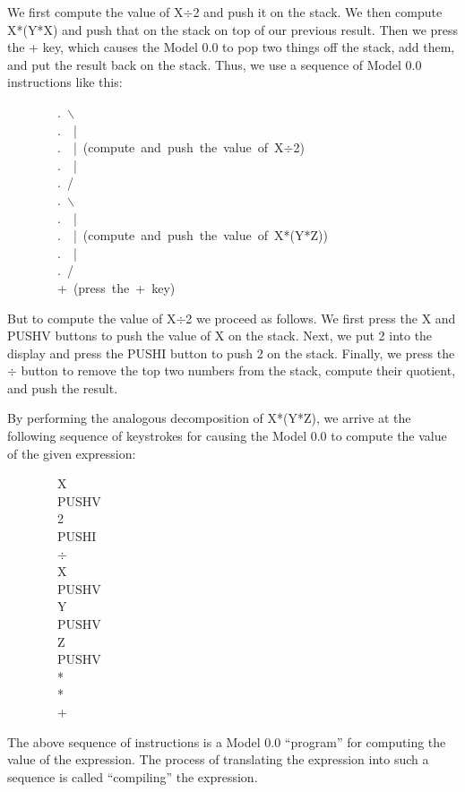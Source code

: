 \documentclass[11pt]{book}
\newenvironment{pubasis}{\begin{flushleft}\ttfamily\small}{\normalsize\rmfamily\end{flushleft}}
\begin{document}
We  first compute
the value of X$\div$2 and push it on the stack.  We  then compute
X*(Y*X) and push that on the stack on top of
our previous result.  Then we
press the + key, which causes the Model 0.0 to pop
two things off the stack, add them, and put the result back on the
stack.  Thus, we  use a sequence of Model 0.0 instructions
like this:
\begin{pubasis}
~~~~~~~~.~$\backslash$\\
~~~~~~~~.~~|\\
~~~~~~~~.~~|~(compute~and~push~the~value~of~X$\div$2)\\
~~~~~~~~.~~|\\
~~~~~~~~.~/\\

~~~~~~~~.~$\backslash$\\
~~~~~~~~.~~|\\
~~~~~~~~.~~|~(compute~and~push~the~value~of~X*(Y*Z))\\
~~~~~~~~.~~|\\
~~~~~~~~.~/\\

~~~~~~~~+~(press~the~+~key)\\
\end{pubasis}
But to compute the value of X$\div$2 we proceed as follows.
We first press the X and PUSHV buttons to push the value
of X on the stack.  Next, we put 2 into the display and
press the PUSHI button to push 2 on the stack.
Finally, we press the $\div$ button to remove the
top two numbers from the stack, compute their quotient,
and push the result.

By performing the analogous decomposition of X*(Y*Z), we
arrive at the following sequence of keystrokes for causing the Model 0.0
to compute the value of the given expression:
\begin{pubasis}
~~~~~~~~X\\
~~~~~~~~PUSHV\\
~~~~~~~~2\\
~~~~~~~~PUSHI\\
~~~~~~~~$\div$\\
~~~~~~~~X\\
~~~~~~~~PUSHV\\
~~~~~~~~Y\\
~~~~~~~~PUSHV\\
~~~~~~~~Z\\
~~~~~~~~PUSHV\\
~~~~~~~~*\\
~~~~~~~~*\\
~~~~~~~~+\\
\end{pubasis}
The above sequence of instructions is  a Model 0.0 ``program'' for
computing the value of the expression.  The process of translating
the expression into such a sequence is called ``compiling'' the expression.
\end{document}
